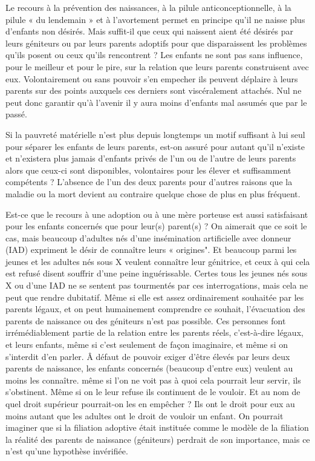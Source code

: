  Le recours à la prévention des naissances, à la pilule anticonceptionnelle, à la pilule « du lendemain » et à l'avortement permet en principe qu'il ne naisse plus d'enfants non désirés. Mais suffit-il que ceux qui naissent aient été désirés par leurs géniteurs ou par leurs parents adoptifs pour que disparaissent les problèmes qu'ils posent ou ceux qu'ils rencontrent ? Les enfants ne sont pas sans influence, pour le meilleur et pour le pire, sur la relation que leurs parents construisent avec eux. Volontairement ou sans pouvoir s'en empecher ils peuvent déplaire à leurs parents sur des points auxquels ces derniers sont viscéralement attachés. Nul ne peut donc garantir qu'à l'avenir il y aura moins d'enfants mal assumés que par le passé. 

 Si la pauvreté matérielle n'est plus depuis longtemps un motif suffisant à lui seul pour séparer les enfants de leurs parents, est-on assuré pour autant qu'il n'existe et n'existera plus jamais d'enfants privés de l'un ou de l'autre de leurs parents alors que ceux-ci sont disponibles, volontaires pour les élever et suffisamment compétents ? L'absence de l'un des deux parents pour d'autres raisons que la maladie ou la mort devient au contraire quelque chose de plus en plus fréquent. 

 Est-ce que le recours à une adoption ou à une mère porteuse est aussi satisfaisant pour les enfants concernés que pour leur(s) parent(s) ? On aimerait que ce soit le cas, mais beaucoup d'adultes nés d'une insémination artificielle avec donneur (IAD) expriment le désir de connaître leurs « origines". Et beaucoup parmi les jeunes et les adultes nés sous X veulent connaître leur génitrice, et ceux à qui cela est refusé disent souffrir d'une peine inguérissable. Certes tous les jeunes nés sous X ou d'une IAD ne se sentent pas tourmentés par ces interrogations, mais cela ne peut que rendre dubitatif. Même si elle est assez ordinairement souhaitée par les parents légaux, et on peut humainement comprendre ce souhait, l'évacuation des parents de naissance ou des géniteurs n'est pas possible. Ces personnes font irrémédiablement partie de la relation entre les parents réels, c'est-à-dire légaux, et leurs enfants, même si c'est seulement de façon imaginaire, et même si on s'interdit d'en parler. Â défaut de pouvoir exiger d'être élevés par leurs deux parents de naissance, les enfants concernés (beaucoup d'entre eux) veulent au moins les connaître.  même si l'on ne voit pas à quoi cela pourrait leur servir, ils s'obstinent. Même si on le leur refuse ils continuent de le vouloir. Et au nom de quel droit supérieur pourrait-on les en empêcher ? Ils ont le droit pour eux au moins autant que les adultes ont le droit de vouloir un enfant. On pourrait imaginer que si la filiation adoptive était instituée comme le modèle de la filiation la réalité des parents de naissance (géniteurs) perdrait de son importance, mais ce n'est qu'une hypothèse invérifiée.

